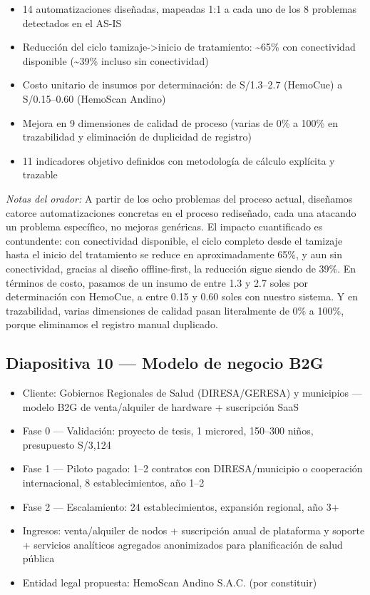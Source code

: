 \documentclass[11pt,a4paper]{article}
\providecommand{\tightlist}{%
  \setlength{\itemsep}{0pt}\setlength{\parskip}{0pt}}
\begin{document}
\begin{itemize}
\tightlist
\item
  14 automatizaciones diseñadas, mapeadas 1:1 a cada uno de los 8 problemas detectados en el AS-IS
\item
  Reducción del ciclo tamizaje-\textgreater inicio de tratamiento: \textasciitilde65\% con conectividad disponible (\textasciitilde39\% incluso sin conectividad)
\item
  Costo unitario de insumos por determinación: de S/1.3--2.7 (HemoCue) a S/0.15--0.60 (HemoScan Andino)
\item
  Mejora en 9 dimensiones de calidad de proceso (varias de 0\% a 100\% en trazabilidad y eliminación de duplicidad de registro)
\item
  11 indicadores objetivo definidos con metodología de cálculo explícita y trazable
\end{itemize}

\emph{Notas del orador:} A partir de los ocho problemas del proceso actual, diseñamos catorce automatizaciones concretas en el proceso rediseñado, cada una atacando un problema específico, no mejoras genéricas. El impacto cuantificado es contundente: con conectividad disponible, el ciclo completo desde el tamizaje hasta el inicio del tratamiento se reduce en aproximadamente 65\%, y aun sin conectividad, gracias al diseño offline-first, la reducción sigue siendo de 39\%. En términos de costo, pasamos de un insumo de entre 1.3 y 2.7 soles por determinación con HemoCue, a entre 0.15 y 0.60 soles con nuestro sistema. Y en trazabilidad, varias dimensiones de calidad pasan literalmente de 0\% a 100\%, porque eliminamos el registro manual duplicado.

\subsection{Diapositiva 10 --- Modelo de negocio B2G}\label{diapositiva-10-modelo-de-negocio-b2g}

\begin{itemize}
\tightlist
\item
  Cliente: Gobiernos Regionales de Salud (DIRESA/GERESA) y municipios --- modelo B2G de venta/alquiler de hardware + suscripción SaaS
\item
  Fase 0 --- Validación: proyecto de tesis, 1 microred, 150--300 niños, presupuesto S/3,124
\item
  Fase 1 --- Piloto pagado: 1--2 contratos con DIRESA/municipio o cooperación internacional, 8 establecimientos, año 1--2
\item
  Fase 2 --- Escalamiento: 24 establecimientos, expansión regional, año 3+
\item
  Ingresos: venta/alquiler de nodos + suscripción anual de plataforma y soporte + servicios analíticos agregados anonimizados para planificación de salud pública
\item
  Entidad legal propuesta: HemoScan Andino S.A.C. (por constituir)
\end{itemize}
\end{document}
